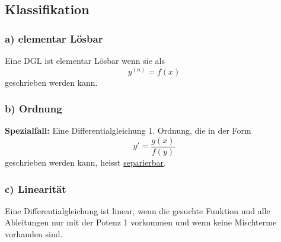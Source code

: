 \subsection{Klassifikation}
\subsubsection*{a) elementar Lösbar}
Eine DGL ist elementar Lösbar wenn sie als 
\begin{equation*}
    y^{\left( n \right)} = f(x)
\end{equation*}
geschrieben werden kann.

\subsubsection*{b) Ordnung}

\textbf{Spezialfall:} Eine Differentialgleichung 1. Ordnung, die in der Form 
\begin{equation*}
    y' = \frac{g(x)}{f(y)}
\end{equation*}
geschrieben werden kann, heisst \underline{separierbar}.

\subsubsection*{c) Linearität}
Eine Differentialgleichung ist linear, wenn die gesuchte Funktion und alle
Ab\-lei\-tun\-gen nur mit der Potenz 1 vorkommen und wenn keine Mischterme vorhanden
sind.

